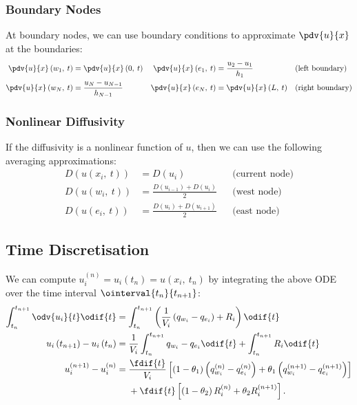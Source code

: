 \documentclass{article}
\begin{document}
\subsubsection{Boundary Nodes}
At boundary nodes, we can use boundary conditions to approximate
\(\pdv{u}{x}\) at the boundaries:
\begin{align*}
    \pdv{u}{x}\left( w_1,\: t \right) & = \pdv{u}{x}\left( 0,\: t \right) & \pdv{u}{x}\left( e_1,\: t \right) & = \frac{u_2 - u_1}{h_1}           &  & \text{(left boundary)}  \\
    \pdv{u}{x}\left( w_N,\: t \right) & = \frac{u_N - u_{N-1}}{h_{N-1}}   & \pdv{u}{x}\left( e_N,\: t \right) & = \pdv{u}{x}\left( L,\: t \right) &  & \text{(right boundary)}
\end{align*}
\subsubsection{Nonlinear Diffusivity}
If the diffusivity is a nonlinear function of \(u\), then we can use
the following averaging approximations:
\begin{align*}
    D\left( u\left( x_i,\: t \right) \right) & = D\left( u_i \right)                                     &  & \text{(current node)} \\
    D\left( u\left( w_i,\: t \right) \right) & = \frac{D\left( u_{i-1} \right) + D\left( u_i \right)}{2} &  & \text{(west node)}    \\
    D\left( u\left( e_i,\: t \right) \right) & = \frac{D\left( u_i \right) + D\left( u_{i+1} \right)}{2} &  & \text{(east node)}
\end{align*}
\subsection{Time Discretisation}
We can compute \(u_i^{\left( n \right)} = u_i\left( t_n \right) =
u\left( x_i,\: t_n \right)\) by integrating the above ODE over the time
interval \(\ointerval{t_n}{t_{n+1}}\):
\begin{align*}
    \int_{t_n}^{t_{n+1}} \odv{u_i}{t} \odif{t}        & = \int_{t_n}^{t_{n+1}} \left( \frac{1}{V_i} \left( q_{w_i} - q_{e_i} \right) + R_i \right) \odif{t} \\
    u_i\left( t_{n+1} \right) - u_i\left( t_n \right) & = \frac{1}{V_i} \int_{t_n}^{t_{n+1}} q_{w_i} - q_{e_i} \odif{t} + \int_{t_n}^{t_{n+1}} R_i \odif{t} \\
    u_i^{\left( n+1 \right)} - u_i^{\left( n \right)} & =
    \begin{aligned}[t]
         & {}\frac{\fdif{t}}{V_i} \left[ \left( 1 - \theta_1 \right) \left( q_{w_i}^{\left( n \right)} - q_{e_i}^{\left( n \right)} \right) + \theta_1 \left( q_{w_i}^{\left( n+1 \right)} - q_{e_i}^{\left( n+1 \right)} \right) \right] \\
         & {}+ \fdif{t} \left[ \left( 1 - \theta_2 \right) R_i^{\left( n \right)} + \theta_2 R_i^{\left( n+1 \right)} \right].
    \end{aligned}
\end{align*}
\end{document}
